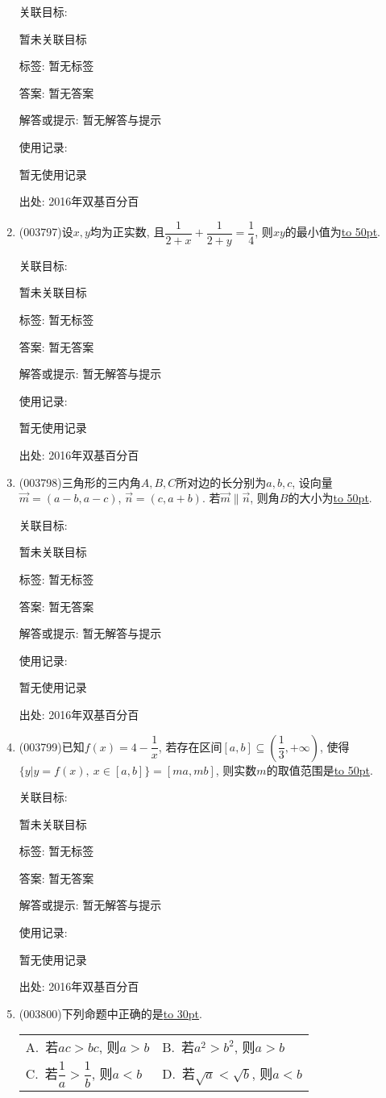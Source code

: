 \documentclass[10pt,a4paper]{article}
\newcommand{\blank}[1]{\underline{\hbox to #1pt{}}}
\newcommand{\twoch}[4]{\par\begin{tabular}{p{.46\textwidth}p{.46\textwidth}}
A.~#1& B.~#2\\
C.~#3& D.~#4
\end{tabular}}
\begin{document}
\begin{enumerate}[1.]
关联目标:

暂未关联目标



标签: 暂无标签

答案: 暂无答案

解答或提示: 暂无解答与提示

使用记录:

暂无使用记录


出处: 2016年双基百分百
\item { (003797)}设$x,y$均为正实数, 且$\dfrac{1}{2+x}+\dfrac{1}{2+y}=\dfrac 14$, 则$xy$的最小值为\blank{50}.


关联目标:

暂未关联目标



标签: 暂无标签

答案: 暂无答案

解答或提示: 暂无解答与提示

使用记录:

暂无使用记录


出处: 2016年双基百分百
\item { (003798)}三角形的三内角$A,B,C$所对边的长分别为$a,b,c$, 设向量$\overrightarrow{m}=(a-b,a-c)$, $\overrightarrow{n}=(c,a+b)$. 若$\overrightarrow{m}\parallel \overrightarrow{n}$, 则角$B$的大小为\blank{50}.


关联目标:

暂未关联目标



标签: 暂无标签

答案: 暂无答案

解答或提示: 暂无解答与提示

使用记录:

暂无使用记录


出处: 2016年双基百分百
\item { (003799)}已知$f(x)=4-\dfrac 1x$, 若存在区间$[a,b]\subseteq \left(\dfrac 13,+\infty\right)$, 使得$\{y|y=f(x), \ x\in [a,b]\}=[ma,mb]$, 则实数$m$的取值范围是\blank{50}.


关联目标:

暂未关联目标



标签: 暂无标签

答案: 暂无答案

解答或提示: 暂无解答与提示

使用记录:

暂无使用记录


出处: 2016年双基百分百
\item { (003800)}下列命题中正确的是\blank{30}.
\twoch{若$ac>bc$, 则$a>b$}{若$a^2>b^2$, 则$a>b$}{若$\dfrac 1a>\dfrac 1b$, 则$a<b$}{若$\sqrt{a}<\sqrt{b}$, 则$a<b$}



\end{enumerate}
\end{document}
